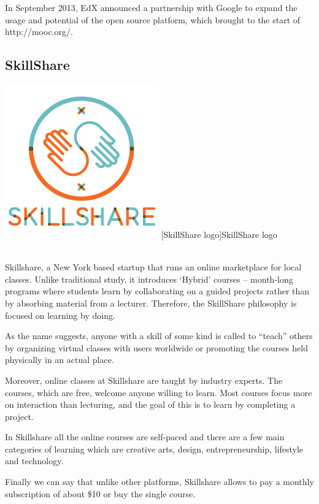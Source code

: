In September 2013, EdX announced a partnership with Google to expand the usage and potential of the open source platform, which brought to the start of http://mooc.org/.


\subsection{SkillShare}
\label{subsec:SkillShare}

\begin{minipage}{\linewidth}
      \centering
      \includegraphics[width=0.3\linewidth]{images/chapter1/skillshare.jpg}
      [SkillShare logo]{SkillShare logo}
  \end{minipage}
  \\




Skillshare, a New York based startup that runs an online marketplace for local classes.
Unlike traditional study, it introduces ‘Hybrid’ courses – month-long programs where students learn by collaborating on a guided projects rather than by absorbing material from a lecturer. Therefore, the SkillShare philosophy is focused on learning by doing.

As the name suggests, anyone with a skill of some kind is called to “teach” others by organizing virtual classes with users worldwide or promoting the courses held physically in an actual place.

Moreover, online classes at Skillshare are taught by industry experts. The courses, which are free, welcome anyone willing to learn. Most courses focus more on interaction than lecturing, and the goal of this is to learn by completing a project.

In Skillshare all the online courses are self-paced and there are a few main categories of learning which are creative arts, design, entrepreneurship, lifestyle and technology.

Finally we can say that unlike other platforms, Skillshare allows to pay a monthly subscription of about \$10 or buy the single course.


